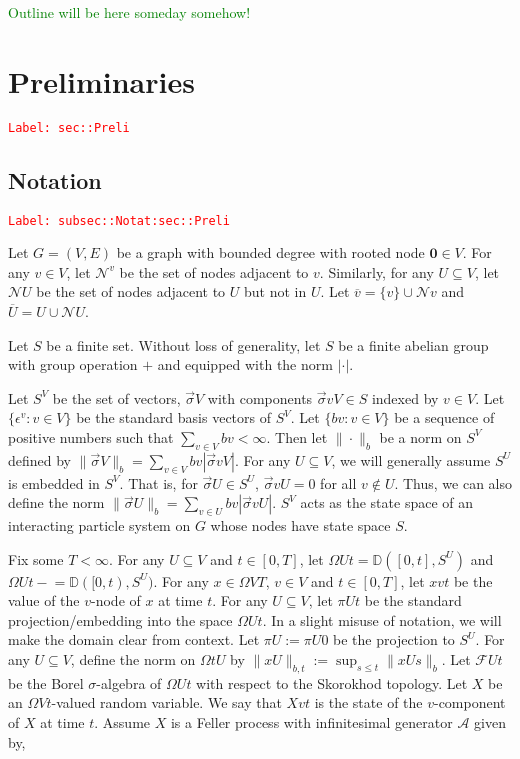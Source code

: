 \documentclass[12pt]{article}
\newcommand{\mb}{\mathbb}
\newcommand{\mc}{\mathcal}
\newcommand{\ov}{\overline}
\newcommand{\ep}{\epsilon}
\newcommand{\tr}{\textcolor{red}}
\newcommand{\tg}{\textcolor{green}}
\newcommand{\labe}[1]{\tr{\texttt{Label: #1}}}
\newcommand{\ind}{\hspace{24pt}}
\newcommand{\defeq}{:=}								%
\newcommand{\cad}{\mb{D}}							%
\renewcommand{\root}{\mathbf{0}}				%
\renewcommand{\v}{v}							%
\renewcommand{\U}{U}							%
\renewcommand{\S}{S}							%
\newcommand{\s}{\sigma}							%
\newcommand{\sv}{\vec{\s}}						%
\renewcommand{\b}{b}							%
\newcommand{\ev}[1]{\ep^{#1}}					%
\newcommand{\T}{T}								%
\newcommand{\x}{x}								%
\renewcommand{\t}{t}							%
\newcommand{\proj}{\pi}							%
\renewcommand{\tt}{s}							%
\newcommand{\F}{\mc{F}}							%
\newcommand{\X}{X}								%
\newcommand{\IG}{\mc{A}}						%
\newcommand{\neigh}{\mc{N}}						%
\newcommand{\cl}{\ov}							%
\renewcommand{\ss}[1]{^{#1}}					%
\newcommand{\XState}[1]{\S^{#1}}				%
\begin{document}
\tg{Outline will be here someday somehow!}


\section{Preliminaries}
\label{sec::Preli}\labe{sec::Preli}

\subsection{Notation}
\label{subsec::Notat:sec::Preli}\labe{subsec::Notat:sec::Preli}

Let \(G = (V,E)\) be a graph with bounded degree with rooted node \(\root \in V\). For any \(\v \in V\), let \(\neigh\ss{\v}\) be the set of nodes adjacent to \(\v\). Similarly, for any \(\U \subseteq  V\), let \(\neigh{\U}\) be the set of nodes adjacent to \(\U\) but not in \(\U\). Let \(\cl{\v} = \{\v\}\cup\neigh{\v}\) and \(\cl{\U} = \U\cup \neigh{\U}\). 

\ind Let \(\S\) be a finite set. Without loss of generality, let \(S\) be a finite abelian group with group operation \(+\) and equipped with the norm \(|\cdot|\). 

\ind Let \(\S^ V\) be the set of vectors, \(\sv{}{ V}\) with components \(\sv{\v}{ V} \in \S\) indexed by \(\v\in  V\). Let \(\{\ev{\v}: \v\in  V\}\) be the standard basis vectors of \(\S^ V\). Let \(\{\b{\v}:\v\in  V\}\) be a sequence of positive numbers such that \(\sum_{\v\in V} \b{\v} < \infty\). Then let \(\|\cdot\|_{\b{}}\) be a norm on \(\S^ V\) defined by \(\|\sv{}{ V}\|_{\b{}} = \sum_{\v\in V} \b{\v}|\sv{\v}{ V}|\). For any \(\U\subseteq  V\), we will generally assume \(\S^\U\) is embedded in \(\S^ V\). That is, for \(\sv{}{\U}\in \S^\U\), \(\sv{\v}{\U} = 0\) for all \(\v\notin\U\). Thus, we can also define the norm \(\|\sv{}{\U}\|_{\b{}} = \sum_{\v\in\U} \b{\v}|\sv{\v}{\U}|\). \(\S^ V\) acts as the state space of an interacting particle system on \(G\) whose nodes have state space \(\S\).

\ind Fix some \(\T < \infty\). For any \(\U\subseteq  V\) and \(\t\in [0,\T]\), let \(\Omega{\U}{\t} = \cad([0,\t],\S^{\U})\) and \(\Omega{\U}{\t-} = \cad([0,\t),\S^\U)\). For any \(\x{}{} \in \Omega{ V}{\T}\), \(\v\in  V\) and  \(\t \in [0,\T]\), let \(\x{\v}{\t}\) be the value of the \(\v\)-node of \(\x{}{}\) at time \(\t\). For any \(\U\subseteq  V\), let \(\proj{\U}{\t}\) be the standard projection/embedding into the space \(\Omega{\U}{\t}\). In a slight misuse of notation, we will make the domain clear from context. Let \(\proj{\U}{} \defeq \proj{\U}{0}\) be the projection to \(\S^\U\). For any \(\U\subseteq  V\), define the norm on \(\Omega{\t}{\U}\) by \(\|\x{\U}{}\|_{\b{},\t} \defeq \sup_{\tt \leq \t} \|\x{\U}{\tt}\|_{\b{}}\). Let \(\F{\U}{\t}\) be the Borel \(\sigma\)-algebra of \(\Omega{\U}{\t}\) with respect to the Skorokhod topology. Let \(\X{}{}\) be an \(\Omega{ V}{\t}\)-valued random variable. We say that \(\X{\v}{\t}\) is the state of the \(\v\)-component of \(\X{}{}\) at time \(\t\). Assume \(\X{}{}\) is a Feller process with infinitesimal generator \(\IG\) given by,
\end{document}
